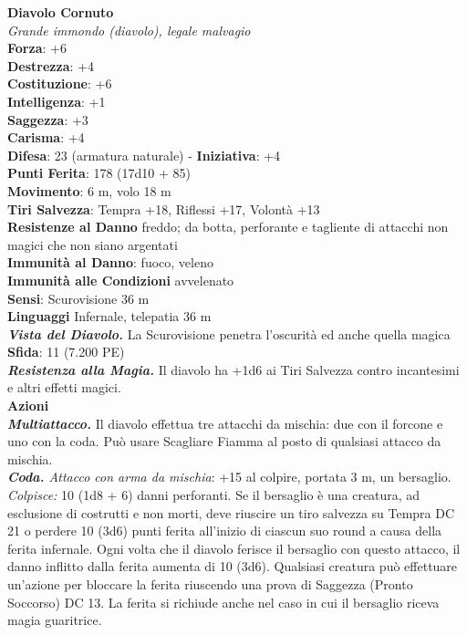 \begin{multicols}{2}
\medskip\textbf{Diavolo Cornuto}\\
\emph{Grande immondo (diavolo), legale malvagio}\\
\textbf{Forza}: +6\\
\textbf{Destrezza}: +4\\
\textbf{Costituzione}: +6\\
\textbf{Intelligenza}: +1\\
\textbf{Saggezza}: +3\\
\textbf{Carisma}: +4\\
\textbf{Difesa}: 23 (armatura naturale) - \textbf{Iniziativa}: +4\\
\textbf{Punti Ferita}: 178 (17d10 + 85)\\
\textbf{Movimento}: 6 m, volo 18 m\\
\textbf{Tiri Salvezza}: Tempra +18, Riflessi +17, Volontà +13\\
\textbf{Resistenze al Danno} freddo; da botta, perforante e tagliente di attacchi non magici che non siano argentati\\
\textbf{Immunità al Danno}: fuoco, veleno\\
\textbf{Immunità alle Condizioni} avvelenato\\
\textbf{Sensi}: Scurovisione 36 m\\
\textbf{Linguaggi} Infernale, telepatia 36 m \\
\emph{\textbf{Vista del Diavolo.}} La Scurovisione penetra l'oscurità ed anche quella magica\\
\textbf{Sfida}: 11 (7.200 PE)\smallskip\\
\emph{\textbf{Resistenza alla Magia.}} Il diavolo ha +1d6 ai Tiri Salvezza contro incantesimi e altri effetti magici.\\
\smallskip\textbf{Azioni}\\
\emph{\textbf{Multiattacco.}} Il diavolo effettua tre attacchi da mischia: due con il forcone e uno con la coda. Può usare Scagliare Fiamma al posto di qualsiasi attacco da mischia.\\
\emph{\textbf{Coda.} Attacco con arma da mischia}: +15 al colpire, portata 3 m, un bersaglio.\\
\emph{Colpisce:} 10 (1d8 + 6) danni perforanti. Se il bersaglio è una creatura, ad esclusione di costrutti e non morti, deve riuscire un tiro salvezza su Tempra DC  21 o perdere 10 (3d6) punti ferita all'inizio di ciascun suo round a causa della ferita infernale. Ogni volta che il diavolo ferisce il bersaglio con questo attacco, il danno inflitto dalla ferita aumenta di 10 (3d6). Qualsiasi creatura può effettuare un'azione per bloccare la ferita riuscendo una prova di Saggezza (Pronto Soccorso) DC  13. La ferita si richiude anche nel caso in cui il bersaglio riceva magia guaritrice.\\

\end{multicols}

